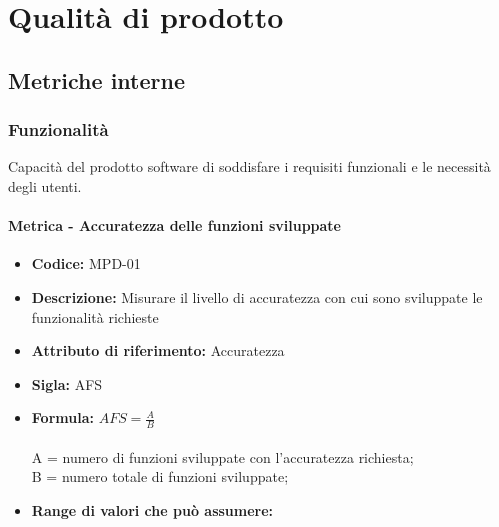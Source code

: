 
\section{Qualità di prodotto}
\subsection{Metriche interne}
 
  \subsubsection{Funzionalità}
      Capacità del prodotto software di soddisfare i requisiti funzionali e le necessità degli utenti.\\
      \paragraph{Metrica -  Accuratezza delle funzioni sviluppate} 
      \begin{itemize}
          \item  \textbf{Codice:} MPD-01
            \item  \textbf{Descrizione:} Misurare il livello di accuratezza con cui sono sviluppate le funzionalità richieste
            \item  \textbf{Attributo di riferimento:} Accuratezza 
           \item   \textbf{Sigla:} AFS
           \item   \textbf{Formula:} \begin{math}AFS = \frac{A}{B}\end{math}\\ \\
              A = numero di funzioni sviluppate con l'accuratezza richiesta;\\
              B = numero totale di funzioni sviluppate;
          \item   \textbf{Range di valori che può assumere:}
       \end{itemize}
              
